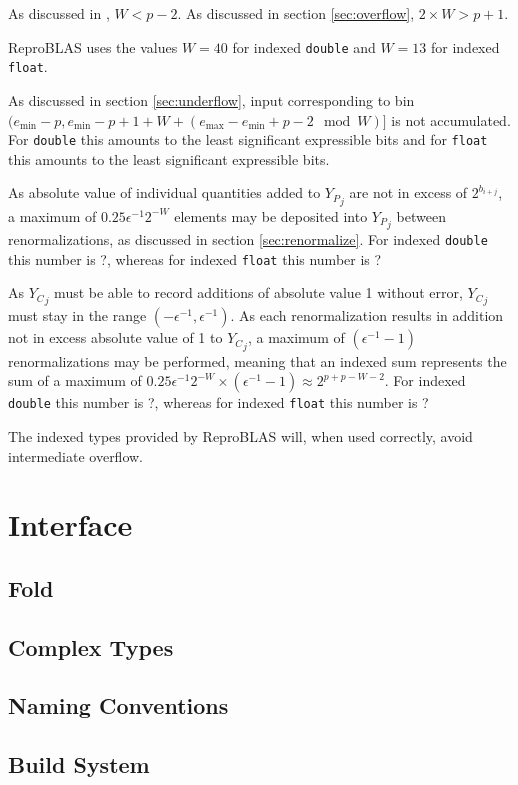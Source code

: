 \documentclass[12pt]{article}
\providecommand{\min}{\ensuremath{\text{min}}}
\providecommand{\max}{\ensuremath{\text{max}}}
\theoremstyle{plain}
\begin{document}
    As discussed in \cite{repsum}, $W < p - 2$. As discussed in section \ref{sec:overflow}, $2\times W > p + 1$.

    ReproBLAS uses the values $W = 40$ for indexed \verb|double| and $W = 13$ for indexed \verb|float|.

    As discussed in section \ref{sec:underflow}, input corresponding to bin $(e_{\min} - p, e_{\min} - p + 1 + W + (e_{\max} - e_{\min} + p - 2 \mod W)]$ is not accumulated. For \verb|double| this amounts to the least significant expressible  bits and for \verb|float| this amounts to the least significant expressible  bits.

    As absolute value of individual quantities added to ${Y_P}_j$ are not in excess of $2^{b_{i + j}}$, a maximum of $0.25\epsilon^{-1}2^{-W}$ elements may be deposited into ${Y_P}_j$ between renormalizations, as discussed in section \ref{sec:renormalize}. For indexed \verb|double| this number is ?, whereas for indexed \verb|float| this number is ?

    As ${Y_C}_j$ must be able to record additions of absolute value 1 without error, ${Y_C}_j$ must stay in the range $(-\epsilon^{-1}, \epsilon^{-1})$. As each renormalization results in addition not in excess absolute value of 1 to ${Y_C}_j$, a maximum of $(\epsilon^{-1} - 1)$ renormalizations may be performed, meaning that an indexed sum represents the sum of a maximum of $0.25\epsilon^{-1}2^{-W} \times (\epsilon^{-1} - 1) \approx 2^{p + p - W - 2}$. For indexed \verb|double| this number is ?, whereas for indexed \verb|float| this number is ?

    The indexed types provided by ReproBLAS will, when used correctly, avoid intermediate overflow.

\section{Interface}
  \subsection{Fold}
  \subsection{Complex Types}
  \subsection{Naming Conventions}
  \subsection{Build System}
\end{document}
